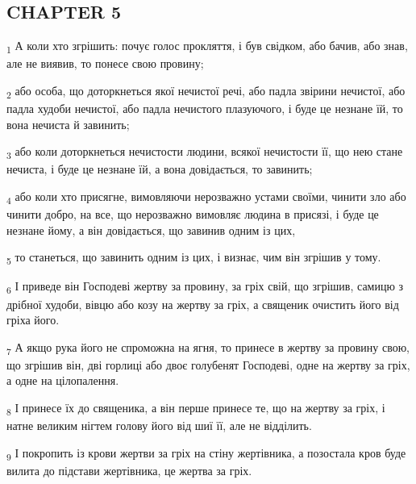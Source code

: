 \subsection{CHAPTER 5}
\begin{tcolorbox}
\textsubscript{1} А коли хто згрішить: почує голос прокляття, і був свідком, або бачив, або знав, але не виявив, то понесе свою провину;
\end{tcolorbox}
\begin{tcolorbox}
\textsubscript{2} або особа, що доторкнеться якої нечистої речі, або падла звірини нечистої, або падла худоби нечистої, або падла нечистого плазуючого, і буде це незнане їй, то вона нечиста й завинить;
\end{tcolorbox}
\begin{tcolorbox}
\textsubscript{3} або коли доторкнеться нечистости людини, всякої нечистости її, що нею стане нечиста, і буде це незнане їй, а вона довідається, то завинить;
\end{tcolorbox}
\begin{tcolorbox}
\textsubscript{4} або коли хто присягне, вимовляючи нерозважно устами своїми, чинити зло або чинити добро, на все, що нерозважно вимовляє людина в присязі, і буде це незнане йому, а він довідається, що завинив одним із цих,
\end{tcolorbox}
\begin{tcolorbox}
\textsubscript{5} то станеться, що завинить одним із цих, і визнає, чим він згрішив у тому.
\end{tcolorbox}
\begin{tcolorbox}
\textsubscript{6} І приведе він Господеві жертву за провину, за гріх свій, що згрішив, самицю з дрібної худоби, вівцю або козу на жертву за гріх, а священик очистить його від гріха його.
\end{tcolorbox}
\begin{tcolorbox}
\textsubscript{7} А якщо рука його не спроможна на ягня, то принесе в жертву за провину свою, що згрішив він, дві горлиці або двоє голубенят Господеві, одне на жертву за гріх, а одне на цілопалення.
\end{tcolorbox}
\begin{tcolorbox}
\textsubscript{8} І принесе їх до священика, а він перше принесе те, що на жертву за гріх, і натне великим нігтем голову його від шиї її, але не відділить.
\end{tcolorbox}
\begin{tcolorbox}
\textsubscript{9} І покропить із крови жертви за гріх на стіну жертівника, а позостала кров буде вилита до підстави жертівника, це жертва за гріх.
\end{tcolorbox}
